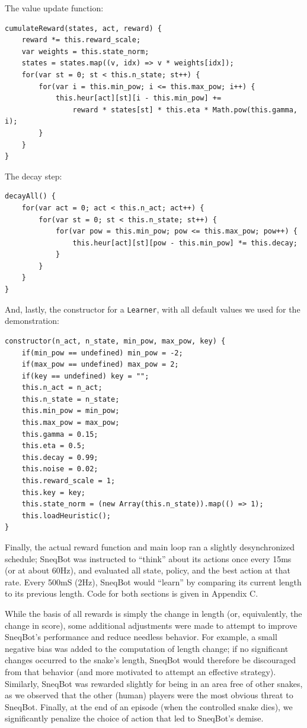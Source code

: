 \documentclass{article}
\begin{document}
	The value update function:

	\begin{lstlisting}
cumulateReward(states, act, reward) {
	reward *= this.reward_scale;
	var weights = this.state_norm;
	states = states.map((v, idx) => v * weights[idx]);
	for(var st = 0; st < this.n_state; st++) {
		for(var i = this.min_pow; i <= this.max_pow; i++) {
			this.heur[act][st][i - this.min_pow] += 
				reward * states[st] * this.eta * Math.pow(this.gamma, i);
		}
	}
}
	\end{lstlisting}

	The decay step:

	\begin{lstlisting}
decayAll() {
	for(var act = 0; act < this.n_act; act++) {
		for(var st = 0; st < this.n_state; st++) {
			for(var pow = this.min_pow; pow <= this.max_pow; pow++) {
				this.heur[act][st][pow - this.min_pow] *= this.decay;
			}
		}
	}
}
	\end{lstlisting}

	And, lastly, the constructor for a {\tt Learner}, with all default values
	we used for the demonstration:

	\begin{lstlisting}
constructor(n_act, n_state, min_pow, max_pow, key) {
	if(min_pow == undefined) min_pow = -2;
	if(max_pow == undefined) max_pow = 2;
	if(key == undefined) key = "";
	this.n_act = n_act;
	this.n_state = n_state;
	this.min_pow = min_pow;
	this.max_pow = max_pow;
	this.gamma = 0.15;
	this.eta = 0.5;
	this.decay = 0.99;
	this.noise = 0.02;
	this.reward_scale = 1;
	this.key = key;
	this.state_norm = (new Array(this.n_state)).map(() => 1);
	this.loadHeuristic();
}
	\end{lstlisting}

	Finally, the actual reward function and main loop ran a slightly
	desynchronized schedule; SneqBot was instructed to ``think'' about its
	actions once every 15ms (or at about 60Hz), and evaluated all state,
	policy, and the best action at that rate. Every 500mS (2Hz), SneqBot would
	``learn'' by comparing its current length to its previous length. Code for
	both sections is given in Appendix C.

	While the basis of all rewards is simply the change in length (or,
	equivalently, the change in score), some additional adjustments were made
	to attempt to improve SneqBot's performance and reduce needless behavior.
	For example, a small negative bias was added to the computation of length
	change; if no significant changes occurred to the snake's length, SneqBot
	would therefore be discouraged from that behavior (and more motivated to
	attempt an effective strategy). Similarly, SneqBot was rewarded slightly
	for being in an area free of other snakes, as we observed that the other
	(human) players were the most obvious threat to SneqBot. Finally, at the
	end of an episode (when the controlled snake dies), we significantly
	penalize the choice of action that led to SneqBot's demise.
\end{document}
